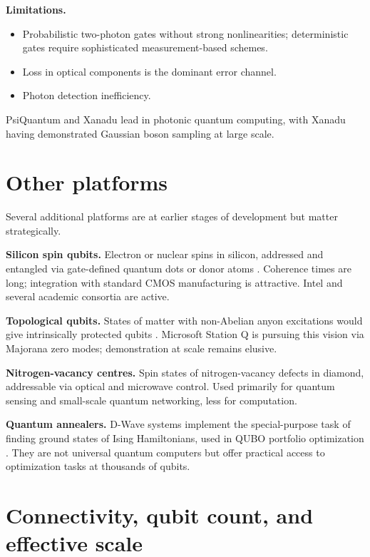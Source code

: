 \textbf{Limitations.}
\begin{itemize}
\item Probabilistic two-photon gates without strong nonlinearities; deterministic gates require sophisticated measurement-based schemes.
\item Loss in optical components is the dominant error channel.
\item Photon detection inefficiency.
\end{itemize}

PsiQuantum and Xanadu lead in photonic quantum computing, with Xanadu having demonstrated Gaussian boson sampling at large scale.

\section{Other platforms}

Several additional platforms are at earlier stages of development but matter strategically.

\textbf{Silicon spin qubits.} Electron or nuclear spins in silicon, addressed and entangled via gate-defined quantum dots or donor atoms \citep{loss_quantum_1998,kane_silicon_1998}. Coherence times are long; integration with standard CMOS manufacturing is attractive. Intel and several academic consortia are active.

\textbf{Topological qubits.} States of matter with non-Abelian anyon excitations would give intrinsically protected qubits \citep{kitaev_fault-tolerant_2003}. Microsoft Station Q is pursuing this vision via Majorana zero modes; demonstration at scale remains elusive.

\textbf{Nitrogen-vacancy centres.} Spin states of nitrogen-vacancy defects in diamond, addressable via optical and microwave control. Used primarily for quantum sensing and small-scale quantum networking, less for computation.

\textbf{Quantum annealers.} D-Wave systems implement the special-purpose task of finding ground states of Ising Hamiltonians, used in QUBO portfolio optimization \citep{morapakula_end--end_2026}. They are not universal quantum computers but offer practical access to optimization tasks at thousands of qubits.

\section{Connectivity, qubit count, and effective scale}

